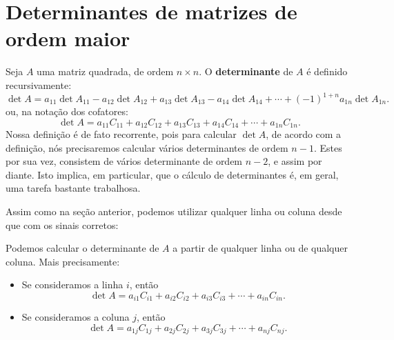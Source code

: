 \documentclass[../livro.tex]{subfiles}  %
\begin{document}
\section{Determinantes de matrizes de ordem maior}

Seja $A$ uma matriz quadrada, de ordem $n \times n$. O \textbf{determinante} de $A$ é definido recursivamente:
\begin{equation}\label{defdet}
\boxed{\det A = a_{11} \det A_{11} - a_{12} \det A_{12} +  a_{13} \det A_{13} - a_{14} \det A_{14} + \cdots + (-1)^{1+n}  a_{1n} \det A_{1n}.}
\end{equation} ou, na notação dos cofatores:
\[
\boxed{\det A = a_{11} C_{11} + a_{12} C_{12} + a_{13} C_{13} + a_{14} C_{14} + \cdots + a_{1n} C_{1n}.}
\] Nossa definição é de fato recorrente, pois para calcular $\det A$, de acordo com a definição, nós precisaremos calcular vários determinantes de ordem $n-1$. Estes por sua vez, consistem de vários determinante de ordem $n-2$, e assim por diante. Isto implica, em particular, que o cálculo de determinantes é, em geral, uma tarefa bastante trabalhosa.

Assim como na seção anterior, podemos utilizar qualquer linha ou coluna desde que com os sinais corretos:


\begin{theorem}
	Podemos calcular o determinante de $A$ a partir de qualquer linha ou de qualquer coluna. Mais precisamente:
	\begin{itemize}
		\item Se consideramos a linha $i$, então
		\[
		\det A = a_{i1} C_{i1} + a_{i2} C_{i2} + a_{i3} C_{i3} + \cdots + a_{in} C_{in}.
		\]
		\item Se consideramos a coluna $j$, então
		\[
		\det A = a_{1j} C_{1j} + a_{2j} C_{2j} + a_{3j} C_{3j} + \cdots + a_{nj} C_{nj}.
		\]
	\end{itemize}
\end{theorem}
\end{document}
